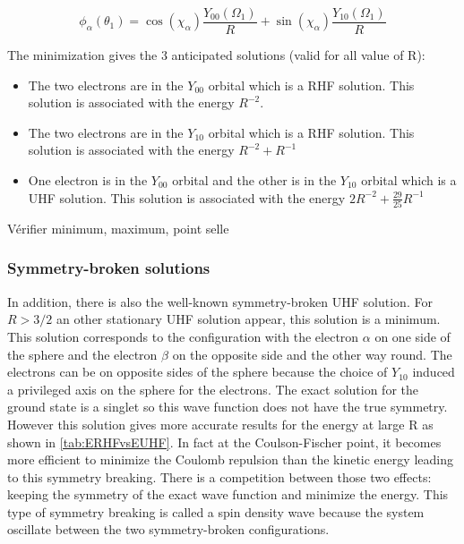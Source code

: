 \documentclass[11pt,a4paper]{article}
\begin{document}
{\begin{equation}
\phi_\alpha(\theta_1)= \cos(\chi_\alpha)\frac{Y_{00}(\Omega_1)}{R} + \sin(\chi_\alpha)\frac{Y_{10}(\Omega_1)}{R}
\end{equation}
 
The minimization gives the 3 anticipated solutions (valid for all value of R):
\begin{itemize}
\item The two electrons are in the $Y_{00}$ orbital which is a RHF solution. This solution is associated with the energy $R^{-2}$.
\item The two electrons are in the $Y_{10}$ orbital which is a RHF solution. This solution is associated with the energy $R^{-2} + R^{-1}$
\item One electron is in the $Y_{00}$ orbital and the other is in the $Y_{10}$ orbital which is a UHF solution. This solution is associated with the energy $2R^{-2}+\frac{29}{25}R^{-1}$
\end{itemize}

Vérifier minimum, maximum, point selle

\subsubsection{Symmetry-broken solutions}

In addition, there is also the well-known symmetry-broken UHF solution. For $R>3/2$ an other stationary UHF solution appear, this solution is a minimum. This solution corresponds to the configuration with the electron $\alpha$ on one side of the sphere and the electron $\beta$ on the opposite side and the other way round. The electrons can be on opposite sides of the sphere because the choice of $Y_{10}$ induced a privileged axis on the sphere for the electrons. The exact solution for the ground state is a singlet so this wave function does not have the true symmetry. However this solution gives more accurate results for the energy at large R as shown in \autoref{tab:ERHFvsEUHF}. In fact at the Coulson-Fischer point, it becomes more efficient to minimize the Coulomb repulsion than the kinetic energy leading to this symmetry breaking. There is a competition between those two effects: keeping the symmetry of the exact wave function and minimize the energy. This type of symmetry breaking is called a spin density wave because the system oscillate between the two symmetry-broken configurations.

}
\end{document}
